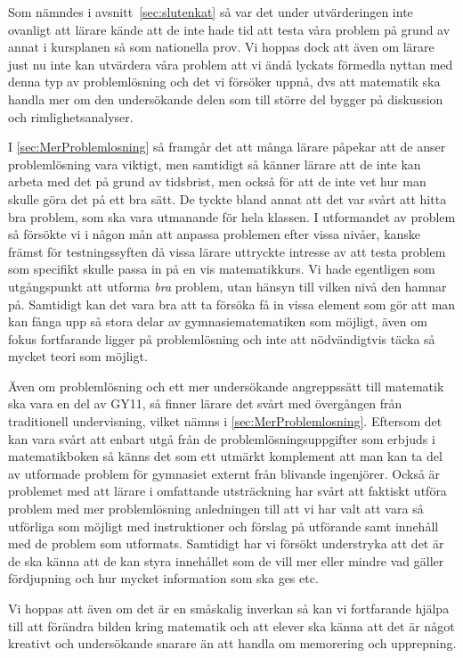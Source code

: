 \textcolor{lila}{Som nämndes i avsnitt~\ref{sec:slutenkat} så var det under utvärderingen }\textcolor{Mahogany}{inte ovanligt att lärare kände att de inte hade tid att testa våra problem på grund av annat i kursplanen så som nationella prov. Vi hoppas dock att även om lärare just nu inte kan utvärdera våra problem att vi ändå lyckats förmedla nyttan med denna typ av problemlösning och det vi försöker uppnå, dvs att matematik ska handla mer om den undersökande delen som till större del bygger på diskussion och rimlighetsanalyser.}

\textcolor{Mahogany}{I \ref{sec:MerProblemlosning} så framgår det att många lärare påpekar att de anser problemlösning vara viktigt, men samtidigt så känner lärare att de inte kan arbeta med det på grund av tidsbrist, men också för att de inte vet hur man skulle göra det på ett bra sätt. De tyckte bland annat att det var svårt att hitta bra problem, som ska vara utmanande för hela klassen. I utformandet av problem så försökte vi i någon mån att anpassa problemen efter vissa nivåer, kanske främst för testningssyften då vissa lärare uttryckte intresse av att testa problem som specifikt skulle passa in på en vis matematikkurs. Vi hade egentligen som utgångspunkt att utforma \textit{bra} problem, utan hänsyn till vilken nivå den hamnar på. Samtidigt kan det vara bra att ta försöka få in vissa element som gör att man kan fånga upp så stora delar av gymnasiematematiken som möjligt, även om fokus fortfarande ligger på problemlösning och inte att nödvändigtvis täcka så mycket teori som möjligt.}

\textcolor{Mahogany}{Även om problemlösning och ett mer undersökande angreppssätt till matematik ska vara en del av GY11, så finner lärare det svårt med övergången från traditionell undervisning, vilket nämns i \ref{sec:MerProblemlosning}. Eftersom det kan vara svårt att enbart utgå från de problemlösningsuppgifter som erbjuds i matematikboken så känns det som ett utmärkt komplement att man kan ta del av utformade problem för gymnasiet externt från blivande ingenjörer. Också är problemet med att lärare i omfattande utsträckning har svårt att faktiskt utföra problem med mer problemlösning anledningen till att vi har valt att vara så utförliga som möjligt med instruktioner och förslag på utförande samt innehåll med de problem som utformats. Samtidigt har vi försökt understryka att det är de ska känna att de kan styra innehållet som de vill mer eller mindre vad gäller fördjupning och hur mycket information som ska ges etc.}

\textcolor{Mahogany}{Vi hoppas att även om det är en småskalig inverkan så kan vi fortfarande hjälpa till att förändra bilden kring matematik och att elever ska känna att det är något kreativt och undersökande snarare än att handla om memorering och upprepning.}